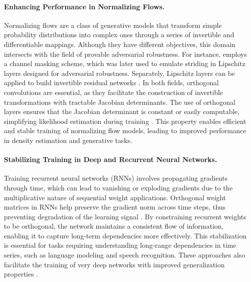     \paragraph{Enhancing Performance in Normalizing Flows.}
    Normalizing flows are a class of generative models that transform simple probability distributions into complex ones through a series of invertible and differentiable mappings. Although they have different objectives, this domain intersects with the field of provable adversarial robustness. For instance, \cite{dinh2016density, rezende2015variational} employs a channel masking scheme, which was later used to emulate striding in Lipschitz layers designed for adversarial robustness. Separately, Lipschitz layers can be applied to build invertible residual networks \cite{behrmann2019invertible}. In both fields, orthogonal convolutions are essential, as they facilitate the construction of invertible transformations with tractable Jacobian determinants. The use of orthogonal layers ensures that the Jacobian determinant is constant or easily computable, simplifying likelihood estimation during training \cite{kingma2018glow}. This property enables efficient and stable training of normalizing flow models, leading to improved performance in density estimation and generative tasks.
    
    \paragraph{Stabilizing Training in Deep and Recurrent Neural Networks.}
    Training recurrent neural networks (RNNs) involves propagating gradients through time, which can lead to vanishing or exploding gradients due to the multiplicative nature of sequential weight applications. Orthogonal weight matrices in RNNs help preserve the gradient norm across time steps, thus preventing degradation of the learning signal \cite{kiani_projunn_2022}. By constraining recurrent weights to be orthogonal, the network maintains a consistent flow of information, enabling it to capture long-term dependencies more effectively. This stabilization is essential for tasks requiring understanding long-range dependencies in time series, such as language modeling and speech recognition. These approaches also facilitate the training of very deep networks \cite{qi_deep_isometric_2020} with improved generalization properties \cite{bansal2018gainorthogonalityregularizationstraining}.
    
